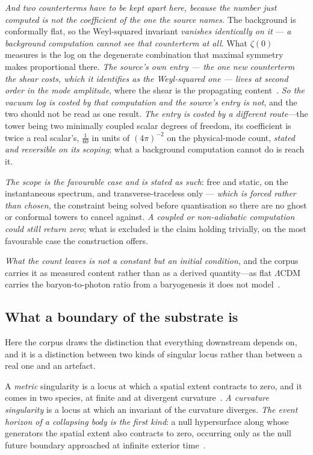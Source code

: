 \documentclass[11pt,a4paper]{article}
\theoremstyle{plain}
\theoremstyle{definition}
\begin{document}
\emph{And two counterterms have to be kept apart here, because the number just computed is not the
coefficient of the one the source names.} The background is conformally flat, so the Weyl-squared invariant
\emph{vanishes identically on it} --- \emph{a background computation cannot see that counterterm at
all}. What $\zeta(0)$ measures is the log on the degenerate combination that maximal symmetry makes
proportional there. \emph{The source's own entry --- the one new counterterm the shear costs, which it
identifies as the Weyl-squared one --- lives at second order in the mode amplitude}, where the shear is the
propagating content~\cite{JanzenCanonicalTime}. \emph{So the vacuum log is costed by that computation and the source's entry is not},
and the two should not be read as one result. \emph{The entry is costed by a different route}---the tower
being two minimally coupled scalar degrees of freedom, its coefficient is twice a real scalar's,
$\tfrac{1}{60}$ in units of $(4\pi)^{-2}$ on the physical-mode count, \emph{stated and reversible on its
scoping}; what a background computation cannot do is reach it.

\emph{The scope is the favourable case and is stated as such}: free and static, on the instantaneous
spectrum, and transverse-traceless only --- \emph{which is forced rather than chosen}, the constraint being
solved before quantisation so there are no ghost or conformal towers to cancel against. \emph{A coupled or
non-adiabatic computation could still return zero}; what is excluded is the claim holding trivially, on the
most favourable case the construction offers.

\emph{What the count leaves is not a constant but an initial condition}, and the corpus carries it as
measured content rather than as a derived quantity---as flat $\Lambda$CDM carries the baryon-to-photon ratio
from a baryogenesis it does not model~\cite{JanzenCRcosmology}.

\subsection{What a boundary of the substrate is}\label{sec:boundary}

Here the corpus draws the distinction that everything downstream depends on, and it is a distinction between
two kinds of singular locus rather than between a real one and an artefact.

A \emph{metric} singularity is a locus at which a spatial extent contracts to zero, and it comes in two
species, at finite and at divergent curvature~\cite{JanzenCircle}. \emph{A curvature singularity} is a locus at which an invariant of the curvature diverges. \emph{The
event horizon of a collapsing body is the first kind}: a null hypersurface along whose generators the spatial
extent also contracts to zero, occurring only as the null future boundary approached at infinite exterior
time~\cite{JanzenBHcausality}.
\end{document}
